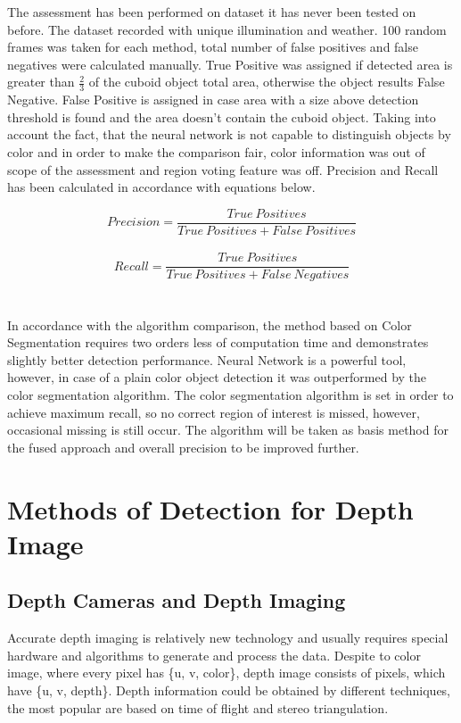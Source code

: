 \documentclass{ctuthesis}
\begin{document}
The assessment has been performed on dataset it has never been tested on before. The dataset recorded with unique illumination and weather. 100 random frames was taken for each method, total number of false positives and false negatives were calculated manually. True Positive was assigned if detected area is greater than $\frac{2}{3}$ of the cuboid object total area, otherwise the object results False Negative. False Positive is assigned in case area with a size above detection threshold is found and the area doesn't contain the cuboid object. Taking into account the fact, that the neural network is not capable to distinguish objects by color and in order to make the comparison fair, color information was out of scope of the assessment and region voting feature was off. Precision and Recall has been calculated in accordance with equations below.

\[ Precision = \frac{True\ Positives}{True\ Positives + False\ Positives} \]
\\
\[ Recall = \frac{True\ Positives}{True\ Positives + False\ Negatives} \]
\\
\\
In accordance with the algorithm comparison, the method based on Color Segmentation requires two orders less of computation time and demonstrates slightly better detection performance. Neural Network is a powerful tool, however, in case of a plain color object detection it was outperformed by the color segmentation algorithm. The color segmentation algorithm is set in order to achieve maximum recall, so no correct region of interest is missed, however, occasional missing is still occur. The algorithm will be taken as basis method for the fused approach and overall precision to be improved further.

\chapter{Methods of Detection for Depth Image}
\section{Depth Cameras and Depth Imaging}
Accurate depth imaging is relatively new technology and usually requires special hardware and algorithms to generate and process the data. Despite to color image, where every pixel has \{u, v, color\}, depth image consists of pixels, which have \{u, v, depth\}. Depth information could be obtained by different techniques, the most popular are based on time of flight and stereo triangulation.
\end{document}
